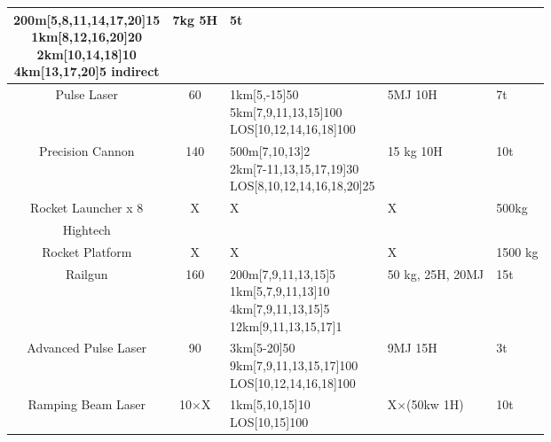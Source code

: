 \begin{tabular}{c|clll}
{                                  200m[5,8,11,14,17,20]15\\
                                  1km[8,12,16,20]20\\
                                  2km[10,14,18]10 \\
                                  4km[13,17,20]5 indirect }
                                        & 7kg 5H & 5t \\
    \hline Pulse Laser & 60 & \makecell[l]{1km[5,-15]50\\
                                   5km[7,9,11,13,15]100\\
                                   LOS[10,12,14,16,18]100}
                                        & 5MJ 10H & 7t\\
    \hline Precision Cannon & 140 & \makecell[l]{500m[7,10,13]2\\
                                         2km[7-11,13,15,17,19]30\\
                                         LOS[8,10,12,14,16,18,20]25}
                                        & 15 kg 10H & 10t\\
    \hline Rocket Launcher x 8 & X & X & X & 500kg \\
    \hline\hline Hightech &&&&\\
    \hline Rocket Platform & X & X & X & 1500 kg \\
    \hline Railgun & 160 & \makecell[l]{200m[7,9,11,13,15]5\\
                                1km[5,7,9,11,13]10\\
                                4km[7,9,11,13,15]5\\
                                12km[9,11,13,15,17]1}
                                & 50 kg, 25H, 20MJ & 15t\\
    \hline Advanced Pulse Laser & 90 & \makecell[l]{3km[5-20]50\\
                                   9km[7,9,11,13,15,17]100\\
                                   LOS[10,12,14,16,18]100}
                                        & 9MJ 15H & 3t\\
    \hline Ramping Beam Laser & 10\(\times\)X & \makecell[l]{1km[5,10,15]10\\
                                          LOS[10,15]100}
                        & X\(\times\)(50kw 1H) & 10t\\

\end{tabular}\par

